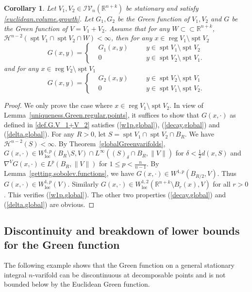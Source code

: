 \documentclass[11pt]{amsart}
\newtheorem{corollary}[theorem]{Corollary}
\theoremstyle{definition}
\newcommand{\HH}{\mathcal{H}}
\newcommand{\R}{\mathbb{R}}
\newcommand{\IV}{\mathcal{IV}}
\newcommand{\loc}{\mathrm{loc}}
\newcommand{\ssubset}{\subset\subset}
\DeclareMathOperator{\spt}{spt}
\DeclareMathOperator{\reg}{reg}
\begin{document}
\begin{corollary}\label{Green.V_1+V_2}
    Let $V_1,V_2\in \IV_n(\R^{n+k})$ be stationary and satisfy \eqref{euclidean.volume.growth}. Let $G_1,G_2$ be the Green function of $V_1,V_2$ and $G$ be the Green function of $V=V_1+V_2$. Assume that for any $W\ssubset\R^{n+k}$, $\HH^{n-2}(\spt V_1\cap \spt V_2\cap W)<\infty$, then for any $x\in \reg V_1\setminus\spt V_2$
    \begin{equation}\label{def.G.V_1+V_2}
        G(x,y)=\left\{\begin{aligned}
		&G_1(x,y)&\quad& y\in \spt V_1\setminus \spt V_2\\
		&0 &\quad &y\in \spt V_2\setminus \spt V_1.
	\end{aligned}\right.
    \end{equation} and for any $x\in \reg V_2\setminus\spt V_1$
    \[G(x,y)=\left\{\begin{aligned}
		&G_2(x,y)&\quad& y\in \spt V_2\setminus \spt V_1\\
		&0 &\quad &y\in \spt V_1\setminus \spt V_2.
	\end{aligned}\right.\]
\end{corollary}
\begin{proof}
    We only prove the case where $x\in \reg V_1\setminus \spt V_2$. In view of Lemma~\ref{uniqueness.Green.regular.points}, it suffices to show that $G(x,\cdot)$ as defined in \eqref{def.G.V_1+V_2} satisfies (\ref{w1p.global}), (\ref{decay.global}) and (\ref{delta.global}). For any $R>0$, let $S=\spt V_1\cap \spt V_2\cap B_R$. We have $\HH^{n-2}(S)<\infty$. By Theorem~\ref{globalGreenvarifolds}, $G(x,\cdot)\in W^{1,p}_\loc(B_R\setminus S,V)\cap  L^\infty( (S)_\delta\cap B_R,\|V\|)$ for $\delta<\frac{1}{2}d(x,S)$ and $\nabla^V G(x,\cdot)\in L^p(B_R, \|V\|)$ for $1\le p< \frac{n}{n-1}$. By Lemma~\ref{getting.sobolev.functions}, we have $G(x,\cdot)\in W^{1,p}(B_{R/2},V)$. Thus $G(x,\cdot)\in W^{1,p}_\loc (V)$. Similarly $G(x,\cdot)\in W^{1,2}_\loc (\R^{n+k}\setminus B_r(x),V)$ for all $r>0$. This verifies (\ref{w1p.global}). The other two properties (\ref{decay.global}) and (\ref{delta.global}) are obvious.
\end{proof}
\subsection{Discontinuity and breakdown of lower bounds for the Green function}
The following example shows that the Green function on a general stationary integral $n$-varifold can be discontinuous at decomposable points and is not bounded below by the Euclidean Green function. 
\end{document}
